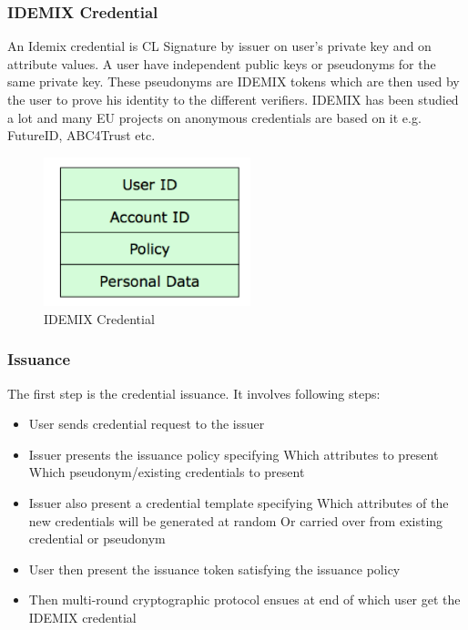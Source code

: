 \subsubsection{IDEMIX Credential}
An Idemix credential is CL Signature by issuer on user's private key and on attribute values. A user have independent public keys or pseudonyms for the same private key. These pseudonyms are IDEMIX tokens which are then used by the user to prove his identity to the different verifiers. IDEMIX has been studied a lot and many EU projects on anonymous credentials are based on it e.g. FutureID, ABC4Trust etc.
\begin{figure}[h]
	\centering
	\includegraphics[width=170pt]{figures/Credential}
	\caption{IDEMIX Credential}
	\label{fig:Credential}
\end{figure}
\subsubsection{Issuance}
The first step is the credential issuance. It involves following steps:
\begin{itemize}
	\item User sends credential request to the issuer
	\item Issuer presents the issuance policy specifying
		\subitem Which attributes to present
		\subitem Which pseudonym/existing credentials to present
	\item Issuer also present a credential template specifying
		\subitem Which attributes of the new credentials will be generated at random
		\subitem Or carried over from existing credential or pseudonym
	\item User then present the issuance token satisfying the issuance policy
	\item Then multi-round cryptographic protocol ensues at end of which user get the IDEMIX credential
\end{itemize}
